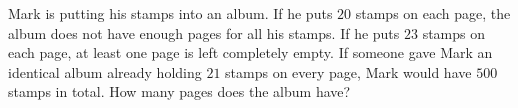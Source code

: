 Mark is putting his stamps into an album. If he puts $20$ stamps on each page, the album does not have enough pages for all his stamps. If he puts $23$ stamps on each page, at least one page is left completely empty. If someone gave Mark an identical album already holding $21$ stamps on every page, Mark would have $500$ stamps in total. How many pages does the album have?
